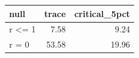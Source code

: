 
\begin{tabular}{lrr}
\toprule
null & trace & critical\_5pct\\
\midrule
r <= 1 & 7.58 & 9.24\\
r = 0 & 53.58 & 19.96\\
\bottomrule
\end{tabular}
